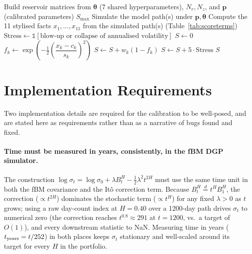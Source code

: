 \documentclass[11pt,a4paper]{article}
\begin{document}
\begin{algorithm}[H]
\caption{\textsc{Score} --- smooth-kernel data-adaptive score $S$}
\label{alg:score}
\begin{algorithmic}[1]
    \State Build reservoir matrices from $\boldsymbol{\theta}$ (7 shared hyperparameters), $N_r, N_z$, and $\mathbf{p}$ (calibrated parameters)
     
        \State \Return $S_{\max}$ 
    \EndIf
    \State Simulate the model path(s) under $\mathbf{p}, \boldsymbol{\theta}$
    \State Compute the 11 stylised facts $x_1,\dots,x_{11}$ from the simulated path(s) (Table~\ref{tab:scoreterms})
    \State $\mathrm{Stress} \gets \mathbb{1}[\text{blow-up or collapse of annualised volatility}]$
    \State $S \gets 0$
        \State $f_k \gets \exp\!\left(-\tfrac12\left(\dfrac{x_k - c_k}{s_k}\right)^{2}\right)$ 
        \State $S \gets S + w_k(1 - f_k)$ 
    \EndFor
    \State $S \gets S + 5\cdot \mathrm{Stress}$
    \State \Return $S$ \Comment{$S \in [0, 15.3)$, $S=0$ is a perfect match}
\EndFunction
\end{algorithmic}
\end{algorithm}


\section{Implementation Requirements}
\label{sec:bug1}

Two implementation details are required for the calibration to be
well-posed, and are stated here as requirements rather than as a
narrative of bugs found and fixed.

\paragraph{Time must be measured in years, consistently, in the fBM
DGP simulator.} The construction $\log\sigma_t=\log\sigma_0+\lambda
B_t^H-\tfrac12\lambda^2t^{2H}$ must use the same time unit in both the
fBM covariance and the It\^o correction term. Because $B_t^H\overset
{d}{=}t^HB_1^H$, the correction ($\propto t^{2H}$) dominates the
stochastic term ($\propto t^H$) for any fixed $\lambda>0$ as $t$ grows;
using a raw day-count index at $H=0.40$ over a 1200-day path drives
$\sigma_t$ to numerical zero (the correction reaches $t^{0.8}\approx291$
at $t=1200$, vs.\ a target of $O(1)$), and every downstream statistic
to NaN. Measuring time in years ($t_{\rm years}=t/252$) in both places
keeps $\sigma_t$ stationary and well-scaled around its target for
every $H$ in the portfolio.
\end{document}
